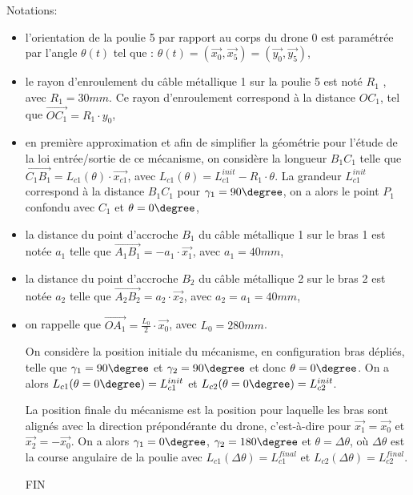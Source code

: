 Notations:
\begin{itemize}
 \item l’orientation de la poulie 5 par rapport au corps du drone 0 est paramétrée par l’angle $\theta(t)$ tel que : $\theta(t)=(\vec{x_0},\vec{x_5})= (\vec{y_0},\vec{y_5})$,
 \item le rayon d’enroulement du câble métallique 1 sur la poulie 5 est noté $R_1$ , avec $R_1=30mm$. Ce rayon d’enroulement correspond à la distance $OC_1$, tel que $\overrightarrow{OC_1}=R_1\cdot y_0$,
 \item en première approximation et afin de simplifier la géométrie pour l’étude de la loi entrée/sortie de ce mécanisme, on considère la longueur $B_1C_1$ telle que $\overrightarrow{C_1B_1}=L_{c1}(\theta)\cdot \vec{x_{c1}}$, avec $
L_{c1}(\theta)=L_{c1}^{init}-R_1\cdot \theta$. La grandeur $L_{c1}^{init}$ correspond à la distance $B_1C_1$ pour $\gamma_1=90\degree$, on a
alors le point $P_1$ confondu avec $C_1$ et $\theta=0\degree$,
 \item la distance du point d’accroche $B_1$ du câble métallique 1 sur le bras 1 est notée $a_1$ telle que $\overrightarrow{A_1B_1}=-a_1\cdot \vec{x_1}$, avec $a_1=40mm$,
 \item la distance du point d’accroche $B_2$ du câble métallique 2 sur le bras 2 est notée $a_2$ telle que $\overrightarrow{A_2B_2}=a_2\cdot \vec{x_2}$, avec $a_2=a_1=40mm$,
 \item on rappelle que $\overrightarrow{OA_1}=\frac{L_0}{2}\cdot \vec{x_0}$, avec $L_0=280mm$.

On considère la position initiale du mécanisme, en configuration bras dépliés, telle que $\gamma_1=90\degree$ et $\gamma_2=90\degree$ et donc $\theta=0\degree$. On a alors $L_{c1}(\theta=0\degree)=L_{c1}^{init}$ et $L_{c2}(\theta=0\degree)=L_{c2}^{init}$.

La position finale du mécanisme est la position pour laquelle les bras sont alignés avec la direction prépondérante du drone, c’est-à-dire pour $\vec{x_1}= \vec{x_0}$ et $\vec{x_2}=-\vec{x_0}$. On a alors $\gamma_1=0\degree$,
$\gamma_2=180\degree$ et $\theta=\Delta\theta$, où $\Delta\theta$ est la course angulaire de la poulie avec $L_{c1}(\Delta\theta)=L_{c1}^{final}$ et $L_{c2}(\Delta\theta)=L_{c2}^{final}$.

\begin{center}
\Large{FIN}
\end{center}

\end{itemize}

